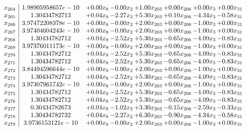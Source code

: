 \documentclass[8pt]{article}
\begin{document}
\[\begin{array}{c| c c@{\hskip 2pt} c@{\hskip 2pt} c@{\hskip 2pt} c@{\hskip 2pt} c@{\hskip 2pt} c@{\hskip 2pt} }
 x_{264}   &  1.98905958657e-10 & +  0.00 x_{8} & -0.00 x_{2} & +  1.00 x_{203} & +  0.00 x_{206} & +  0.00 x_{3} & +  0.00 x_{31}\\
 x_{265}   &  1.30434782713 & +  0.04 x_{8} & -2.27 x_{2} & +  5.30 x_{203} & +  0.10 x_{206} & -4.34 x_{3} & -0.58 x_{31}\\
 x_{266}   &  3.97472208378e-10 & +  0.00 x_{8} & -0.00 x_{2} & +  2.00 x_{203} & +  0.00 x_{206} & -1.00 x_{3} & +  0.00 x_{31}\\
 x_{267}   &  3.97404604243e-10 & +  0.00 x_{8} & -0.00 x_{2} & +  2.00 x_{203} & +  0.00 x_{206} & -1.00 x_{3} & +  0.00 x_{31}\\
 x_{268}   &  1.30434782712 & +  0.04 x_{8} & -2.52 x_{2} & +  5.30 x_{203} & -0.65 x_{206} & -4.09 x_{3} & -0.83 x_{31}\\
 x_{269}   &  3.97376011173e-10 & +  0.00 x_{8} & -0.00 x_{2} & +  2.00 x_{203} & +  0.00 x_{206} & -1.00 x_{3} & +  0.00 x_{31}\\
 x_{270}   &  1.30434782712 & +  0.04 x_{8} & -2.52 x_{2} & +  5.30 x_{203} & -0.65 x_{206} & -4.09 x_{3} & -0.83 x_{31}\\
 x_{271}   &  1.30434782712 & +  0.04 x_{8} & -2.52 x_{2} & +  5.30 x_{203} & -0.65 x_{206} & -4.09 x_{3} & -0.83 x_{31}\\
 x_{272}   &  3.84494596644e-10 & +  0.00 x_{8} & -0.00 x_{2} & +  2.00 x_{203} & +  0.00 x_{206} & -1.00 x_{3} & +  0.00 x_{31}\\
 x_{273}   &  1.30434782712 & +  0.04 x_{8} & -2.52 x_{2} & +  5.30 x_{203} & -0.65 x_{206} & -4.09 x_{3} & -0.83 x_{31}\\
 x_{274}   &  3.97307961742e-10 & +  0.00 x_{8} & -0.00 x_{2} & +  2.00 x_{203} & +  0.00 x_{206} & -1.00 x_{3} & +  0.00 x_{31}\\
 x_{275}   &  1.30434782712 & +  0.04 x_{8} & -2.52 x_{2} & +  5.30 x_{203} & -0.65 x_{206} & -4.09 x_{3} & -0.83 x_{31}\\
 x_{276}   &  1.30434782712 & +  0.04 x_{8} & -2.52 x_{2} & +  5.30 x_{203} & -0.65 x_{206} & -4.09 x_{3} & -0.83 x_{31}\\
 x_{277}   &  0.30434782673 & +  0.04 x_{8} & -1.02 x_{2} & +  3.30 x_{203} & -0.15 x_{206} & -2.59 x_{3} & -0.33 x_{31}\\
 x_{278}   &  1.30434782732 & +  0.04 x_{8} & -2.27 x_{2} & +  6.30 x_{203} & -0.90 x_{206} & -4.34 x_{3} & -0.58 x_{31}\\
 x_{279}   &  3.9736153121e-10 & +  0.00 x_{8} & -0.00 x_{2} & +  2.00 x_{203} & +  0.00 x_{206} & -1.00 x_{3} & +  0.00 x_{31}\\

\end{array}\]
\end{document}
